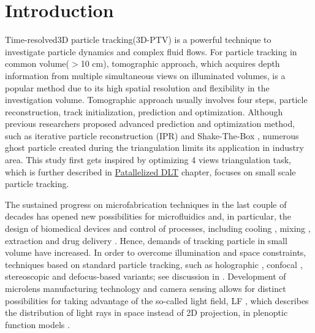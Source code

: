 \documentclass[draftthesis,fullpage]{uiucthesis}
\begin{document}


\chapter{Introduction}\label{chapter:intro}

Time-resolved3D particle tracking(3D-PTV) is a powerful technique to investigate particle dynamics and complex fluid flows. For particle tracking in common volume($>$10 cm), tomographic approach, which acquires depth information from multiple simultaneous views on illuminated volumes, is a popular method due to its high spatial resolution and
flexibility in the investigation volume. Tomographic approach usually involves four steps, particle reconstruction, track initialization, prediction and optimization. Although previous researchers proposed advanced prediction and optimization method, such as iterative particle reconstruction (IPR) \citep{wieneke2012iterative} and Shake-The-Box \citep{schanz2016shake}, numerous ghost particle created during the triangulation limits its application in industry area. This study first gets inspired by optimizing 4 views triangulation task, which is further described in \hyperref[chapter:DLT]{Patallelized DLT} chapter, focuses on small scale particle tracking.

The sustained progress on microfabrication techniques in the last couple of decades has opened new possibilities for microfluidics and, in particular,  the design of biomedical devices and control of processes, including cooling \citep{singhal2004microscale}, mixing  \citep{song2003millisecond,liu2004two}, extraction \citep{hisamoto2001chip, kluge2009production} and drug delivery \citep{tsai2007review, nguyen2013design}. Hence, demands of tracking particle in small volume have increased. In order to overcome illumination and space constraints, techniques based on standard particle tracking, such as holographic \citep{sheng2006digital, soria2008towards, memmolo2011twin, daloglu2018label}, confocal \citep{kinoshita2007three, lima2008vitro}, stereoscopic \citep{lindken2006stereoscopic, bown2006three} and defocus-based \citep{yoon20063d, pereira2007microscale} variants; see discussion in \citet{wereley2010recent}. Development of microlens manufacturing technology and camera sensing allows for distinct possibilities for taking advantage of the so-called light field, LF \citep{gershun1939light}, which describes the distribution of light rays in space instead of 2D projection, in plenoptic function models  \citep{adelson1991plenoptic}.
\end{document}
